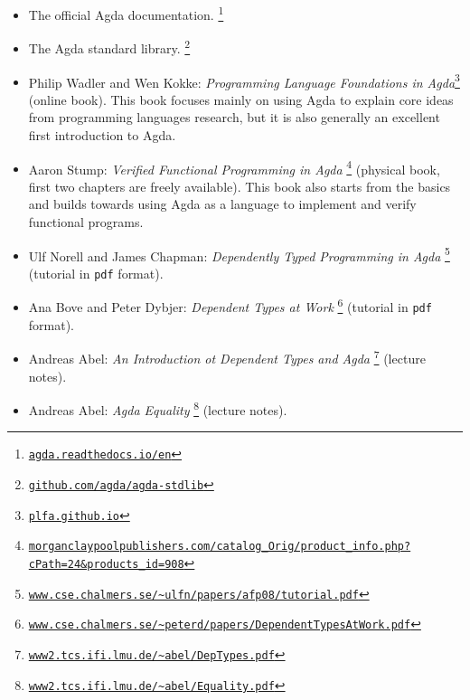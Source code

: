 \documentclass[a4paper,UKenglish]{tufte-handout}
\newcommand{\hrefu}[2]{\href{#1}{\nolinkurl{#2}}}
\theoremstyle{definition}
\begin{document}
\begin{itemize}

\item The official Agda documentation.%
  \footnote{\hrefu{https://agda.readthedocs.io/en/}{agda.readthedocs.io/en}}

\item The Agda standard library.%
  \footnote{\hrefu{https://github.com/agda/agda-stdlib}{github.com/agda/agda-stdlib}}

\item Philip Wadler and Wen Kokke: \emph{Programming Language
  Foundations in Agda}\footnote{\hrefu{https://plfa.github.io/}{plfa.github.io}} (online
  book). This book focuses mainly on using Agda to explain core ideas
  from programming languages research, but it is also generally an
  excellent first introduction to Agda.

\item Aaron Stump: \emph{Verified Functional Programming in Agda}%
  \footnote{\hrefu{https://www.morganclaypoolpublishers.com/catalog_Orig/product_info.php?cPath=24&products_id=908}{morganclaypoolpublishers.com/catalog_Orig/product_info.php?cPath=24&products_id=908}}
  (physical book, first two chapters are freely available). This book
  also starts from the basics and builds towards using Agda as a
  language to implement and verify functional programs.

\item Ulf Norell and James Chapman: \emph{Dependently Typed
  Programming in Agda}%
  \footnote{\hrefu{http://www.cse.chalmers.se/~ulfn/papers/afp08/tutorial.pdf}{www.cse.chalmers.se/~ulfn/papers/afp08/tutorial.pdf}}
  (tutorial in \texttt{pdf} format).

\item Ana Bove and Peter Dybjer: \emph{Dependent Types at Work}%
  \footnote{\hrefu{http://www.cse.chalmers.se/~peterd/papers/DependentTypesAtWork.pdf}{www.cse.chalmers.se/~peterd/papers/DependentTypesAtWork.pdf}}
  (tutorial in \texttt{pdf} format).

\item Andreas Abel: \emph{An Introduction ot Dependent Types and Agda}%
  \footnote{\hrefu{http://www2.tcs.ifi.lmu.de/~abel/DepTypes.pdf}{www2.tcs.ifi.lmu.de/~abel/DepTypes.pdf}} (lecture notes).

\item Andreas Abel: \emph{Agda Equality}%
  \footnote{\hrefu{http://www2.tcs.ifi.lmu.de/~abel/Equality.pdf}{www2.tcs.ifi.lmu.de/~abel/Equality.pdf}} (lecture
  notes).



\end{itemize}


\end{document}
